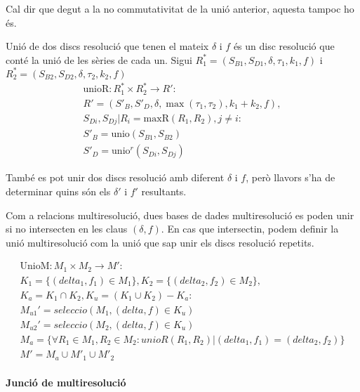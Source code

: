 Cal dir que degut a la no commutativitat de la unió anterior, aquesta
tampoc ho és.




Unió de dos discs resolució que tenen el mateix $\delta$ i $f$ és un
disc resolució que conté la unió de les sèries de cada un.  Sigui
$R_1^*=(S_{B1},S_{D1},\delta,\tau_1,k_1,f)$ i
$R_2^*=(S_{B2},S_{D2},\delta,\tau_2,k_2,f)$
  \begin{gather*}
    \text{unioR}: R_1^* \times R_2^* \longrightarrow R': \\
    R' = (S'_B,S'_D,\delta,\max(\tau_1,\tau_2),k_1+k_2,f), \\
    S_{Di}, S_{Dj} | R_i = \text{maxR}(R_1,R_2), j \neq i:  \\
    S'_B = \text{unio}(S_{B1},S_{B2})\\
    S'_D = \text{unio}^r(S_{Di},S_{Dj})
\end{gather*}

També es pot unir dos discs resolució amb diferent $\delta$ i $f$,
però llavors s'ha de determinar quins són els $\delta'$ i $f'$
resultants.


Com a relacions multiresolució, dues bases de dades multiresolució es
poden unir si no intersecten en les claus $(\delta,f)$.  En cas que
intersectin, podem definir la unió multiresolució com la unió que sap unir els discs resolució repetits.

\begin{gather*}
    \text{UnioM}: M_1 \times M_2 \longrightarrow M': \\
    K_1 = \{(delta_1,f_1) \in M_1\},K_2 = \{(delta_2,f_2) \in M_2\}, \\
    K_a = K_1 \cap K_2, K_u =  (K_1 \cup K_2) - K_a : \\
    M_{u1}'= seleccio(M_1, (delta,f) \in K_u)\\
    M_{u2}'= seleccio(M_2, (delta,f) \in K_u)\\
    M_a = \{\forall R_1\in M_1,R_2\in M_2: unioR(R_1,R_2) |
       (delta_1,f_1) = (delta_2,f_2) \} \\
    M' =  M_{a} \cup  M'_{1}  \cup  M'_{2}     
\end{gather*}






\paragraph{Junció de multiresolució}





